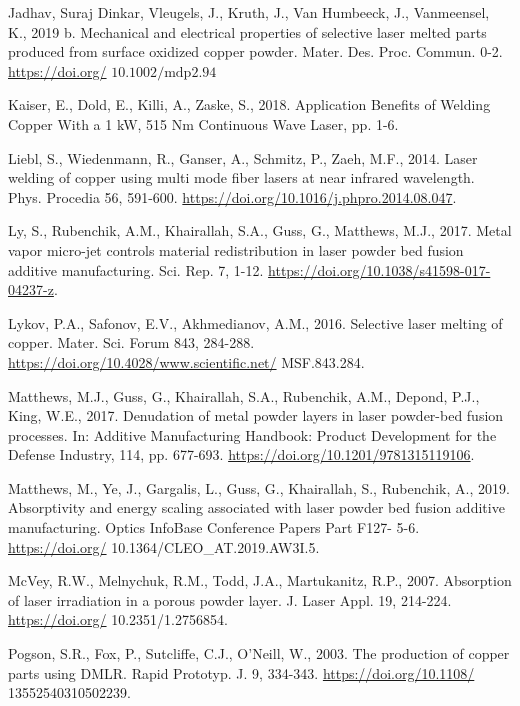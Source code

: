 \documentclass[10pt]{article}
\begin{document}
Jadhav, Suraj Dinkar, Vleugels, J., Kruth, J., Van Humbeeck, J., Vanmeensel, K., 2019 b. Mechanical and electrical properties of selective laser melted parts produced from surface oxidized copper powder. Mater. Des. Proc. Commun. 0-2. \href{https://doi.org/}{https://doi.org/} $10.1002 / \mathrm{mdp} 2.94$

Kaiser, E., Dold, E., Killi, A., Zaske, S., 2018. Application Benefits of Welding Copper With a 1 kW, 515 Nm Continuous Wave Laser, pp. 1-6.

Liebl, S., Wiedenmann, R., Ganser, A., Schmitz, P., Zaeh, M.F., 2014. Laser welding of copper using multi mode fiber lasers at near infrared wavelength. Phys. Procedia 56, 591-600. \href{https://doi.org/10.1016/j.phpro.2014.08.047}{https://doi.org/10.1016/j.phpro.2014.08.047}.

Ly, S., Rubenchik, A.M., Khairallah, S.A., Guss, G., Matthews, M.J., 2017. Metal vapor micro-jet controls material redistribution in laser powder bed fusion additive manufacturing. Sci. Rep. 7, 1-12. \href{https://doi.org/10.1038/s41598-017-04237-z}{https://doi.org/10.1038/s41598-017-04237-z}.

Lykov, P.A., Safonov, E.V., Akhmedianov, A.M., 2016. Selective laser melting of copper. Mater. Sci. Forum 843, 284-288. \href{https://doi.org/10.4028/www.scientific.net/}{https://doi.org/10.4028/www.scientific.net/} MSF.843.284.

Matthews, M.J., Guss, G., Khairallah, S.A., Rubenchik, A.M., Depond, P.J., King, W.E., 2017. Denudation of metal powder layers in laser powder-bed fusion processes. In: Additive Manufacturing Handbook: Product Development for the Defense Industry, 114, pp. 677-693. \href{https://doi.org/10.1201/9781315119106}{https://doi.org/10.1201/9781315119106}.

Matthews, M., Ye, J., Gargalis, L., Guss, G., Khairallah, S., Rubenchik, A., 2019. Absorptivity and energy scaling associated with laser powder bed fusion additive manufacturing. Optics InfoBase Conference Papers Part F127- 5-6. \href{https://doi.org/}{https://doi.org/} 10.1364/CLEO\_AT.2019.AW3I.5.

McVey, R.W., Melnychuk, R.M., Todd, J.A., Martukanitz, R.P., 2007. Absorption of laser irradiation in a porous powder layer. J. Laser Appl. 19, 214-224. \href{https://doi.org/}{https://doi.org/} 10.2351/1.2756854.

Pogson, S.R., Fox, P., Sutcliffe, C.J., O'Neill, W., 2003. The production of copper parts using DMLR. Rapid Prototyp. J. 9, 334-343. \href{https://doi.org/10.1108/}{https://doi.org/10.1108/} 13552540310502239.
\end{document}
